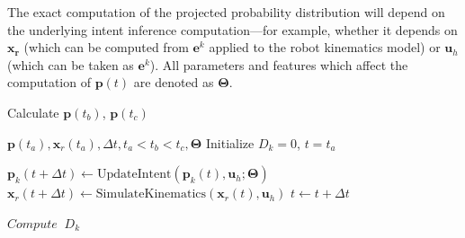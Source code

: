  The exact computation of the projected probability distribution will depend on the underlying intent inference computation---for example, whether it depends on $\boldsymbol{x_r}$ (which can be computed from $\boldsymbol{e}^k$ applied to the robot kinematics model) or $\boldsymbol{u}_h$ (which can be taken as $\boldsymbol{e}^k$). All parameters and features which affect the computation of $\boldsymbol{p}(t)$ are denoted as $\boldsymbol{\Theta}$. 

\begin{algorithm}
	\caption{Calculate $\boldsymbol{p}(t_b)$, $\boldsymbol{p}(t_c)$}
	\label{alg1}
	\begin{algorithmic}[1]
		\REQUIRE $\boldsymbol{p}(t_a), \boldsymbol{x}_r(t_a), \Delta t, t_a < t_b < t_c, \boldsymbol{\Theta}$
		\STATE Initialize $D_k = 0$, $t = t_a$
		
			\STATE $\boldsymbol{p}_k(t + \Delta t) \leftarrow \text{UpdateIntent}(\boldsymbol{p}_k(t), \boldsymbol{u}_h; \boldsymbol{\Theta})$
			\STATE $\boldsymbol{x}_r(t + \Delta t) \leftarrow \text{SimulateKinematics}(\boldsymbol{x}_r(t), \boldsymbol{u}_h)$
			  
			\ENDIF
			  \ENDIF
			\STATE $t \leftarrow t + \Delta t$
		\ENDWHILE
	
%		
		
		\STATE $Compute \;\;D_k$
		\ENDFOR
		
	\end{algorithmic}
\end{algorithm}

